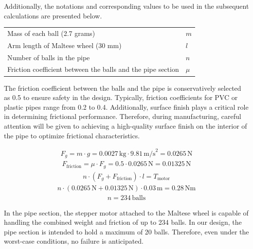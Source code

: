 \documentclass[12pt]{article}
\begin{document}
Additionally, the notations and corresponding values to be used in the subsequent calculations are presented below.


\begin{table}[h!]
\centering
\label{tab:system_parameters}
\begin{tabular}{ll} 
Mass of each ball (2.7 grams)  & $m$  \\ 
Arm length of Maltese wheel (30 mm) & $l$ \\ 
Number of balls in the pipe & $n$ \\ 
Friction coefficient between the balls and the pipe section  & $\mu$  \\ 
\end{tabular}
\end{table}



The friction coefficient between the balls and the pipe is conservatively selected as 0.5 to ensure safety in the design. Typically, friction coefficients for PVC or plastic pipes range from 0.2 to 0.4. Additionally, surface finish plays a critical role in determining frictional performance. Therefore, during manufacturing, careful attention will be given to achieving a high-quality surface finish on the interior of the pipe to optimize frictional characteristics.

\begin{align}
F_g = m \cdot g = 0.0027 \, \text{kg} \cdot 9.81 \, \text{m/s}^2 = 0.0265 \, \text{N}
\end{align}
\begin{align}
F_{\text{friction}} = \mu \cdot F_g = 0.5 \cdot 0.0265 \, \text{N} = 0.01325 \, \text{N}
\end{align}
\begin{align}
n \cdot (F_g + F_{\text{friction}}) \cdot l = T_{\text{motor}}
\end{align}
\begin{align}
n \cdot (0.0265 \, \text{N} + 0.01325 \, \text{N}) \cdot 0.03 \, \text{m} = 0.28 \, \text{Nm}
\end{align}
\begin{align}
n = 234 \, \text{balls}
\end{align}

In the pipe section, the stepper motor attached to the Maltese wheel is capable of handling the combined weight and friction of up to 234 balls.
 In our design, the pipe section is intended to hold a maximum of 20 balls. Therefore, even under the worst-case conditions, no failure is anticipated.
 
\end{document}
